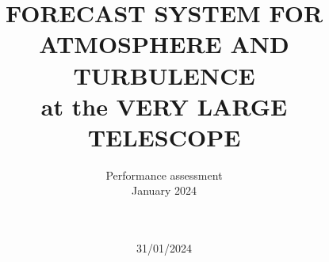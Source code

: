 \documentclass[a4paper]{article}
\title{FORECAST SYSTEM FOR ATMOSPHERE AND TURBULENCE\\
at the VERY LARGE TELESCOPE}
\author{
\vspace{1.0cm}
\begin{minipage}{9.5cm}
\begin{center}
\LARGE{Performance assessment}\\
\LARGE{January 2024}\\
\end{center}
\end{minipage}\\
\vspace{3cm}
}
\date{31/01/2024}
\begin{document}
 
\maketitle 



\contents     %


%
%
%
%
%
%
%
%
%
%
%
%





\end{document}
